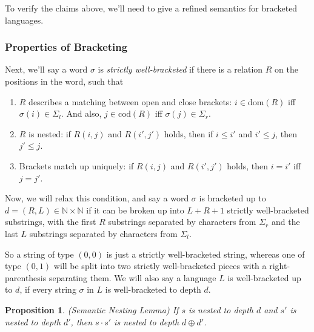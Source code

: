 \documentclass{article}
\newcommand{\nats}{\mathbb{N}}
\newcommand{\combine}[2]{{#1} \oplus {#2}}
\newcommand{\zero}{(0,0)}
\newtheorem{prop}{Proposition}
\begin{document}
To verify the claims above, we'll need to give a refined semantics for bracketed 
languages. 

\subsubsection{Properties of Bracketing}

Next, we'll say a word $\sigma$ is \emph{strictly well-bracketed} if there is a
relation $R$ on the positions in the word, such that

\begin{enumerate}
\item $R$ describes a matching between open and close brackets: 
      $i \in \mathrm{dom}(R)$ iff $\sigma(i) \in \Sigma_l$. And also,
      $j \in \mathrm{cod}(R)$ iff $\sigma(j) \in \Sigma_r$.
\item $R$ is nested: if $R(i, j)$ and $R(i', j')$ holds, then if $i \leq i'$ and $i' \leq j$, then $j' \leq j$. 
\item Brackets match up uniquely: if $R(i, j)$ and $R(i', j')$ holds, then $i = i'$ iff $j = j'$. 
\end{enumerate}

Now, we will relax this condition, and say a word $\sigma$ is
bracketed up to $d = (R, L) \in \nats \times \nats$ if it can
be broken up into $L + R + 1$ strictly well-bracketed substrings, with 
the first $R$ substrings separated by characters from $\Sigma_r$ and
the last $L$ substrings separated by characters from $\Sigma_l$. 

So a string of type $\zero$ is just a strictly well-bracketed string,
whereas one of type $(0, 1)$ will be split into two strictly
well-bracketed pieces with a right-parenthesis separating them. We
will also say a language $L$ is well-bracketed up to $d$, if every
string $\sigma$ in $L$ is well-bracketed to depth $d$.


\begin{prop}{(Semantic Nesting Lemma)}
If $s$ is nested to depth $d$ and $s'$ is nested to depth $d'$, then 
$s\cdot s'$ is nested to depth $\combine{d}{d'}$.
\end{prop}
\end{document}
